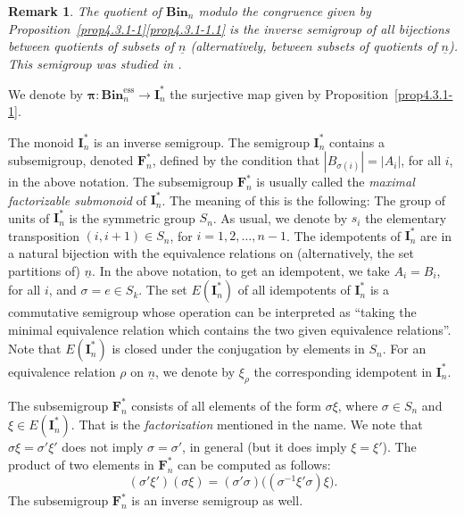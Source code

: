 \documentclass[a4paper]{amsart}
\newtheorem{remark}[theorem]{Remark}
\begin{document}
\begin{remark}\label{rem4.3.1-51}
{\sf
The quotient of $\mathbf{Bin}_n$ modulo the congruence given by 
Proposition~\ref{prop4.3.1-1}\eqref{prop4.3.1-1.1} is the  inverse semigroup of
all bijections between quotients  of subsets of $\underline{n}$
(alternatively, between subsets of quotients of $\underline{n}$).
This semigroup was studied in \cite{KuMa,KMU}.
}
\end{remark}


We denote by $\boldsymbol{\pi}:\mathbf{Bin}_n^\mathrm{ess}\to \mathbf{I}^*_n$ the surjective map
given by Proposition~\ref{prop4.3.1-1}.

The monoid $\mathbf{I}^*_n$ is an inverse semigroup. The semigroup 
$\mathbf{I}^*_n$ contains a subsemigroup, denoted $\mathbf{F}^*_n$,
defined by the condition that $|B_{\sigma(i)}|=|A_i|$, for all $i$, in the 
above notation. The subsemigroup $\mathbf{F}^*_n$
is usually called the {\em maximal factorizable submonoid} of $\mathbf{I}^*_n$.
The meaning of this is the following: 
The group of units of $\mathbf{I}^*_n$ is the symmetric
group $S_n$. As usual, 
we denote by $s_i$ the elementary transposition $(i,i+1)\in S_n$, for $i=1,2,\dots,n-1$.
The idempotents of $\mathbf{I}^*_n$ are in a natural bijection with
the equivalence relations on (alternatively, the set partitions of) $\underline{n}$.
In the above notation, to get an idempotent, we take
$A_i=B_i$, for all $i$, and $\sigma=e\in S_k$. The set $E(\mathbf{I}^*_n)$
of all idempotents of $\mathbf{I}^*_n$ is a commutative semigroup whose
operation can be interpreted as ``taking the minimal equivalence relation which
contains the two given equivalence relations''. Note that $E(\mathbf{I}^*_n)$
is closed under the conjugation by elements in $S_n$. For an equivalence relation
$\rho$ on $\underline{n}$, we denote by $\xi_\rho$ the corresponding idempotent
in $\mathbf{I}^*_n$. 

The subsemigroup $\mathbf{F}^*_n$ consists of all elements of the form
$\sigma\xi$, where $\sigma\in S_n$ and $\xi\in E(\mathbf{I}^*_n)$. That 
is the {\em factorization} mentioned in the name. We note that 
$\sigma\xi=\sigma'\xi'$ does not imply $\sigma=\sigma'$, in general
(but it does imply $\xi=\xi'$). The product of two elements in 
$\mathbf{F}^*_n$ can be computed as follows:
\begin{displaymath}
(\sigma'\xi')(\sigma\xi)=(\sigma'\sigma)\big((\sigma^{-1}\xi'\sigma)\xi\big). 
\end{displaymath}
The subsemigroup $\mathbf{F}^*_n$ is an inverse semigroup as well.
\end{document}
